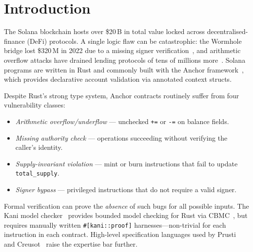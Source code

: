 \documentclass[sigconf,review,anonymous]{acmart}
\begin{document}


\maketitle

\section{Introduction}
\label{sec:intro}

The Solana blockchain hosts over \$20\,B in total value locked
across decentralised-finance (DeFi) protocols.
A single logic flaw can be catastrophic: the Wormhole bridge lost
\$320\,M in 2022 due to a missing signer verification~\cite{wormhole2022},
and arithmetic overflow attacks have drained lending protocols of tens
of millions more~\cite{soteria2021}.
Solana programs are written in Rust and commonly built with the
Anchor framework~\cite{anchor}, which provides declarative account
validation via annotated context structs.

Despite Rust's strong type system, Anchor contracts routinely suffer
from four vulnerability classes:
\begin{itemize}[leftmargin=*,noitemsep]
  \item \emph{Arithmetic overflow/underflow} --- unchecked \texttt{+=}
        or \texttt{-=} on balance fields.
  \item \emph{Missing authority check} --- operations succeeding
        without verifying the caller's identity.
  \item \emph{Supply-invariant violation} --- mint or burn
        instructions that fail to update \texttt{total\_supply}.
  \item \emph{Signer bypass} --- privileged instructions that do not
        require a valid signer.
\end{itemize}

Formal verification can prove the \emph{absence} of such bugs for
all possible inputs.
The Kani model checker~\cite{kani2022} provides bounded model
checking for Rust via CBMC~\cite{cbmc}, but requires manually written
\texttt{\#[kani::proof]} harnesses---non-trivial for each instruction
in each contract.
High-level specification languages used by Prusti~\cite{prusti2019}
and Creusot~\cite{creusot2022} raise the expertise bar further.
\end{document}

